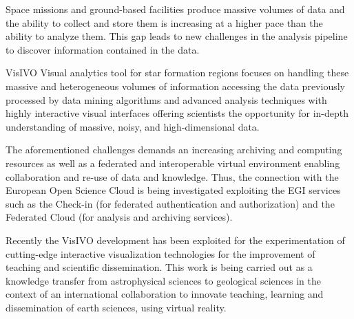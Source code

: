 \documentclass{report}
\begin{document}
Space missions and ground-based facilities produce massive volumes of data and the ability to collect and store them is increasing at a higher pace than the ability to analyze them. This gap leads to new challenges in the analysis pipeline to discover information contained in the data. 

VisIVO Visual analytics tool for star formation regions focuses on handling these massive and heterogeneous volumes of information accessing the data previously processed by data mining algorithms and advanced analysis techniques with highly interactive visual interfaces offering scientists the opportunity for in-depth understanding of massive, noisy, and high-dimensional data.

The aforementioned challenges demands an increasing archiving and computing resources as well as a federated and interoperable virtual environment enabling collaboration and re-use of data and knowledge. Thus, the connection with the European Open Science Cloud is being investigated exploiting the EGI services such as the Check-in (for federated authentication and authorization) and the Federated Cloud (for analysis and archiving services). 

Recently the VisIVO development has been exploited for the experimentation of cutting-edge interactive visualization technologies for the improvement of teaching and scientific dissemination. This work is being carried out as a knowledge transfer from astrophysical sciences to geological sciences in the context of an international collaboration to innovate teaching, learning and dissemination of earth sciences, using virtual reality.\newline
\newpage
\end{document}
